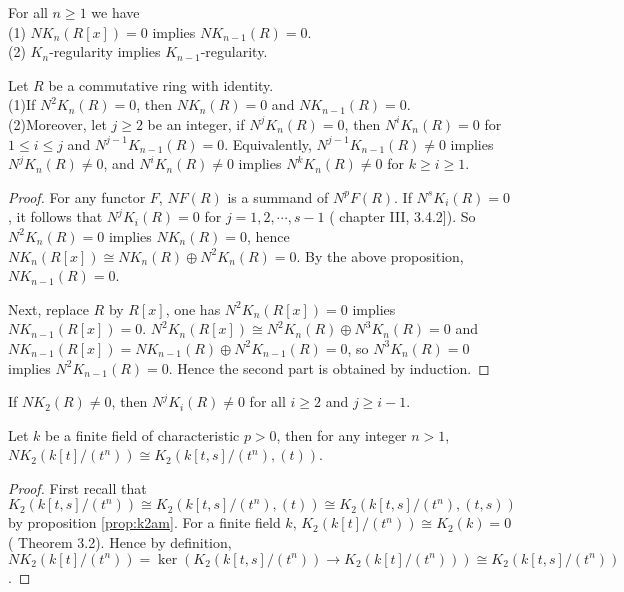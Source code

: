 \begin{prop}
For all $n\geq 1$ we have\\
(1)  $NK_n(R[x])=0$ implies $NK_{n-1}(R)=0$.\\
(2)  $K_n$-regularity implies $K_{n-1}$-regularity.
\end{prop}
\begin{lemma}
	Let $R$ be a commutative ring with identity.\\
	(1)If $N^2K_n(R) = 0$, then $NK_n(R) = 0$ and $NK_{n-1}(R) = 0$.\\
	(2)Moreover, let $j\geq 2$ be an integer, if $N^jK_n(R) = 0$, then $N^iK_n(R) = 0$ for $1\leq i\leq j$ and $N^{j-1}K_{n-1}(R) = 0$. Equivalently, $N^{j-1}K_{n-1}(R)\neq 0$ implies $N^jK_n(R) \neq 0$, and $N^iK_n(R)\neq 0$ implies $N^kK_n(R)\neq 0$ for $k\geq i\geq 1$.
\end{lemma}
\begin{proof}
	For any functor $F$, $NF(R)$ is a summand of $N^pF(R)$.  If $N^sK_i(R)=0$, it follows that $N^jK_i(R) = 0$ for $j = 1,2,\cdots,s - 1$ (\cite{weibel2013k} chapter III, 3.4.2]). So $N^2K_n(R) = 0$ implies $NK_n(R) = 0$, hence $NK_n(R[x])\cong NK_n(R)\oplus N^2K_n(R)=0$. By the above proposition, $NK_{n-1}(R) = 0$.

	Next, replace $R$ by $R[x]$, one has $N^2K_n(R[x]) = 0$ implies $NK_{n-1}(R[x]) = 0$. $N^2K_n(R[x])\cong N^2K_n(R)\oplus N^3K_n(R)=0$ and $NK_{n-1}(R[x]) =NK_{n-1}(R)\oplus N^2K_{n-1}(R)= 0$, so $N^3K_n(R)=0$ implies $N^2K_{n-1}(R)= 0$. Hence the second part is obtained by induction.
\end{proof}
\begin{corollary}
\label{cor:NjKi}
	If $NK_2(R) \neq 0$, then $N^jK_i(R) \neq 0$ for all $i \geq 2$ and $j \geq i - 1$.
\end{corollary}
% 

\begin{lemma}
	Let $k$ be a finite field of characteristic $p>0$, then for any integer $n>1$, $NK_2(k[t]/(t^n))\cong K_2(k[t,s]/(t^n),(t))$.
\end{lemma}
\begin{proof}
	First recall that $K_2(k[t,s]/(t^n))\cong K_2(k[t,s]/(t^n),(t))\cong K_2(k[t,s]/(t^n),(t,s))$ by proposition \ref{prop:k2am}. For a finite field $k$, $K_2(k[t]/(t^n))\cong K_2(k)=0$ (\cite{MORRIS198091} Theorem 3.2). Hence by definition, $NK_2(k[t]/(t^n))=\ker(K_2(k[t,s]/(t^n))\longrightarrow K_2(k[t]/(t^n)))\cong K_2(k[t,s]/(t^n))$.     
\end{proof}

